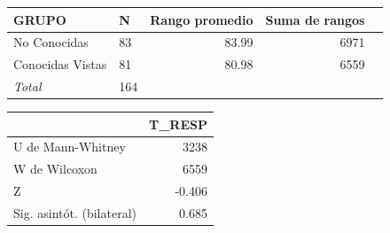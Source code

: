 \documentclass[10pt]{beamer}
\begin{document}
\begin{frame}
	\begin{table}
	  \begin{tabular}[t]{|l|l|r|r|r|}
	    \hline
		\textbf{GRUPO} & \textbf{N} & \textbf{Rango promedio} & \textbf{Suma de rangos} \\ \hline
		No Conocidas & 83 & 83.99 & 6971 \\ \hline
		Conocidas Vistas & 81 & 80.98 & 6559 \\ \hline
		\textit{Total} & 164 &   &   \\ \hline
	  \end{tabular}   \begin{tabular}[t]{|l|r|}
	    \hline
		& \textbf{T\_RESP} \\ \hline
		U de Mann-Whitney & 3238 \\ \hline
		W de Wilcoxon & 6559 \\ \hline
		Z & -0.406 \\ \hline
		Sig. asintót. (bilateral) & 0.685 \\ \hline
	  \end{tabular}
	\end{table}
      \end{frame}
\end{document}
